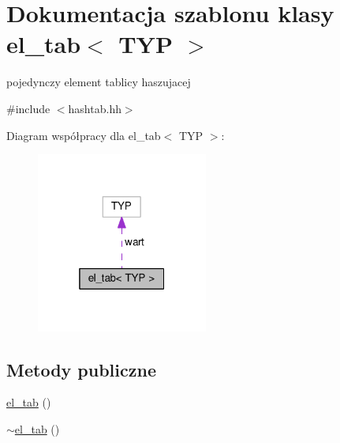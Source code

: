 \hypertarget{classel__tab}{\section{Dokumentacja szablonu klasy el\-\_\-tab$<$ T\-Y\-P $>$}
\label{classel__tab}
}


pojedynczy element tablicy haszujacej  




{\ttfamily \#include $<$hashtab.\-hh$>$}



Diagram współpracy dla el\-\_\-tab$<$ T\-Y\-P $>$\-:\nopagebreak
\begin{figure}[H]
\begin{center}
\leavevmode
\includegraphics[width=160pt]{classel__tab__coll__graph}
\end{center}
\end{figure}
\subsection*{Metody publiczne}
\begin{DoxyCompactItemize}
\item 
\hyperlink{classel__tab_a62c9bef278f50d1e5f41b3fd3773b61d}{el\-\_\-tab} ()
\item 
\hyperlink{classel__tab_acb9e9041b31f9b2cf8224b6b8cebd935}{$\sim$el\-\_\-tab} ()
\end{DoxyCompactItemize}
